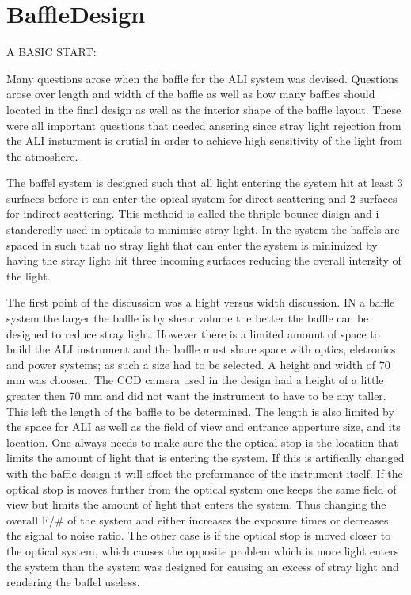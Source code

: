 \section{BaffleDesign}

A BASIC START:

Many questions arose when the baffle for the ALI system was devised. Questions arose over length and width of the baffle as well as how many baffles should located in the final design as well as the interior shape of the baffle layout. These were all important questions that needed ansering since stray light rejection from the ALI insturment is crutial in order to achieve high sensitivity of the light from the atmoshere.

The baffel system is designed such that all light entering the system hit at least 3 surfaces before it can enter the opical system for direct scattering and 2 surfaces for indirect scattering. This methoid is called the thriple bounce disign and i standeredly used in opticals to minimise stray light. In the system the baffels are spaced in such that no stray light that can enter the system is minimized by having the stray light hit three incoming surfaces reducing the overall intersity of the light.

The first point of the discussion was a hight versus width discussion. IN a baffle system the larger the baffle is by shear volume the better the baffle can be designed to reduce stray light. However there is a limited amount of space to build the ALI instrument and the baffle must share space with optics, eletronics and power systems; as such a size had to be selected. A height and width of 70 mm was choosen. The CCD camera used in the design had a height of a little greater then 70 mm and did not want the instrument to have to be any taller. This left the length of the baffle to be determined. The length is also limited by the space for ALI as well as the field of view and entrance apperture size, and its location. One always needs to make sure the the optical stop is the location that limits the amount of light that is entering the system. If this is artifically changed with the baffle design it will affect the preformance of the instrument itself. If the optical stop is moves further from the optical system one keeps the same field of view but limits the amount of light that enters the system. Thus changing the overall F/\# of the system and either increases the exposure times or decreases the signal to noise ratio. The other case is if the optical stop is moved closer to the optical system, which causes the opposite problem which is more light enters the system than the system was designed for causing an excess of stray light and rendering the baffel useless.

